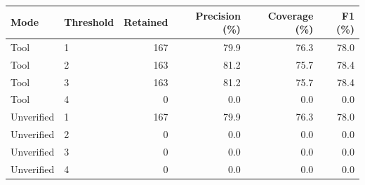 \begin{tabular}{llrrrr}
\toprule
Mode & Threshold & Retained & Precision (\%) & Coverage (\%) & F1 (\%) \\
\midrule
Tool & 1 & 167 & 79.9 & 76.3 & 78.0 \\
Tool & 2 & 163 & 81.2 & 75.7 & 78.4 \\
Tool & 3 & 163 & 81.2 & 75.7 & 78.4 \\
Tool & 4 & 0 & 0.0 & 0.0 & 0.0 \\
\midrule
Unverified & 1 & 167 & 79.9 & 76.3 & 78.0 \\
Unverified & 2 & 0 & 0.0 & 0.0 & 0.0 \\
Unverified & 3 & 0 & 0.0 & 0.0 & 0.0 \\
Unverified & 4 & 0 & 0.0 & 0.0 & 0.0 \\
\bottomrule
\end{tabular}